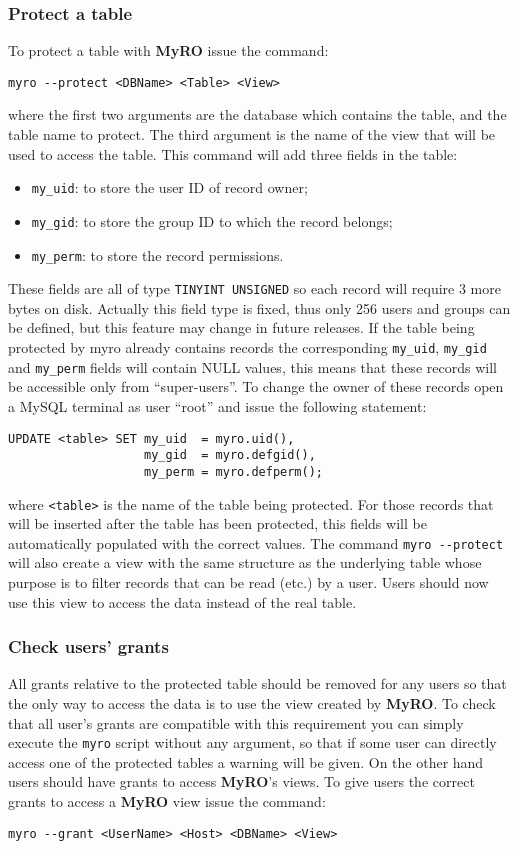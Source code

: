 \documentclass[12pt,titlepage]{article}
\newcommand{\myro}{\textbf{MyRO} }
\newcommand{\myrO}{\textbf{MyRO}}
\begin{document}
\subsubsection{Protect a table}
To protect a table with \myro issue the command:
%
\begin{verbatim}
myro --protect <DBName> <Table> <View>
\end{verbatim}
%
where the first two arguments are the database which contains the
table, and the table name to protect. The third argument is the name
of the view that will be used to access the table. This command will
add three fields in the table:
%
\begin{itemize}
\item \verb|my_uid|: to store the user ID of record owner;
\item \verb|my_gid|: to store the group ID to which the record belongs;
\item \verb|my_perm|: to store the record permissions.
\end{itemize}
%
These fields are all of type \verb|TINYINT UNSIGNED| so each record
will require 3 more bytes on disk. Actually this field type is fixed,
thus only 256 users and groups can be defined, but this feature may
change in future releases. If the table being protected by myro
already contains records the corresponding \verb|my_uid|,
\verb|my_gid| and \verb|my_perm| fields will contain NULL values, this
means that these records will be accessible only from ``super-users''.
To change the owner of these records open a MySQL terminal as user
``root'' and issue the following statement:
%
\begin{verbatim}
UPDATE <table> SET my_uid  = myro.uid(), 
                   my_gid  = myro.defgid(),
                   my_perm = myro.defperm();
\end{verbatim}
%
where \verb|<table>| is the name of the table being protected. For those
records that will be inserted after the table has been protected, this
fields will be automatically populated with the correct values. The
command \verb|myro --protect| will also create a view with the same
structure as the underlying table whose purpose is to filter records
that can be read (etc.) by a user. Users should now use this view to access
the data instead of the real table.

%
\subsubsection{Check users' grants}
\label{sec:myro_Check users' grants}
All grants relative to the protected table should be removed for any
users so that the only way to access the data is to use the view
created by \myrO. To check that all user's grants are compatible with
this requirement you can simply execute the \verb|myro| script without
any argument, so that if some user can directly access one of the
protected tables a warning will be given. On the other hand users
should have grants to access \myrO's views. To give users the correct
grants to access a \myro view issue the command:
%
\begin{verbatim}
myro --grant <UserName> <Host> <DBName> <View>
\end{verbatim}
%
\end{document}

